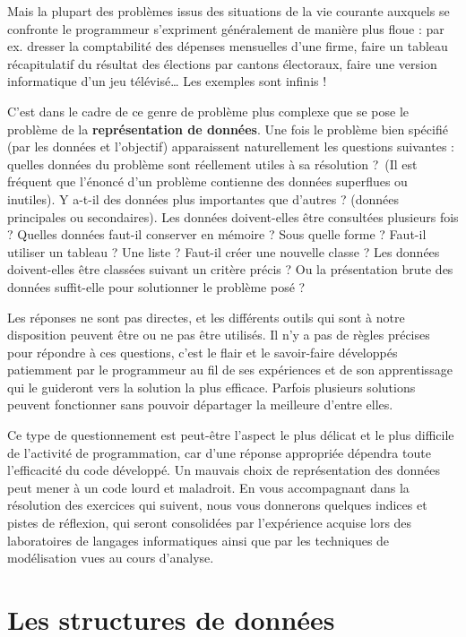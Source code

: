 Mais la plupart des problèmes issus des situations de la vie courante
auxquels se confronte le programmeur s’expriment généralement de
manière plus floue : par ex. dresser la comptabilité des dépenses
mensuelles d’une firme, faire un tableau récapitulatif du résultat des
élections par cantons électoraux, faire une version informatique d’un
jeu télévisé… Les exemples sont infinis !


C’est dans le cadre de ce genre de problème plus complexe que se pose le
problème de la \textbf{représentation de données}. Une fois le problème
bien spécifié (par les données et l’objectif) apparaissent
naturellement les questions suivantes : quelles données du problème
sont réellement utiles à sa résolution ?~(Il est fréquent que l’énoncé
d’un problème contienne des données superflues ou inutiles). Y a-t-il
des données plus importantes que d’autres ? (données principales ou
secondaires). Les données doivent-elles être consultées plusieurs fois ?
Quelles données faut-il conserver en mémoire ? Sous quelle forme ?
Faut-il utiliser un tableau ? Une liste ? Faut-il créer une nouvelle
classe ? Les données doivent-elles être classées suivant un critère
précis ? Ou la présentation brute des données suffit-elle pour
solutionner le problème posé ?

Les réponses ne sont pas directes, et les différents outils qui sont à
notre disposition peuvent être ou ne pas être utilisés. Il n’y a pas de
règles précises pour répondre à ces questions, c’est le flair et le
savoir-faire développés patiemment par le programmeur au fil de ses
expériences et de son apprentissage qui le guideront vers la solution
la plus efficace. Parfois plusieurs solutions peuvent fonctionner sans
pouvoir départager la meilleure d’entre elles.

Ce type de questionnement est peut-être l’aspect le plus délicat et le
plus difficile de l’activité de programmation, car d’une réponse
appropriée dépendra toute l’efficacité du code développé. Un mauvais
choix de représentation des données peut mener à un code lourd et
maladroit. 
En vous accompagnant dans la résolution des exercices qui suivent,
nous vous donnerons quelques indices et pistes de réflexion, 
qui seront consolidées par l’expérience acquise lors des
laboratoires de langages informatiques ainsi que par les techniques de
modélisation vues au cours d’analyse.


\section{Les structures de données%
}

